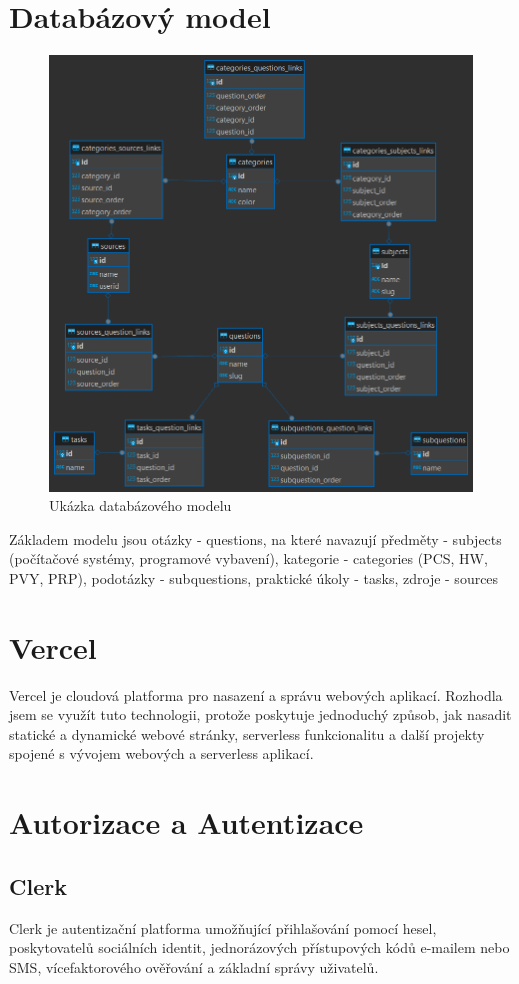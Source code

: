\documentclass[12pt, a4paper,
oneside,      %
openright
]{report}
\begin{document}
\newpage
\section{Databázový model}

\begin{figure}[h]
	\centering
	\includegraphics[width=0.7\linewidth]{image/scheme.png} 
	\caption{Ukázka databázového modelu}
\end{figure}

Základem modelu jsou otázky - questions, na které navazují předměty - subjects (počítačové systémy, programové vybavení), kategorie - categories (PCS, HW, PVY, PRP), podotázky - subquestions, praktické úkoly - tasks, zdroje - sources

\section{Vercel}
Vercel je cloudová platforma pro nasazení a správu webových aplikací. Rozhodla jsem se využít tuto technologii, protože poskytuje jednoduchý způsob, jak nasadit statické a dynamické webové stránky, serverless funkcionalitu a další projekty spojené s vývojem webových a serverless aplikací.

\section{Autorizace a Autentizace}

\newpage
\subsection{Clerk}
Clerk je autentizační platforma umožňující přihlašování pomocí hesel, poskytovatelů sociálních identit, jednorázových přístupových kódů e-mailem nebo SMS, vícefaktorového ověřování a základní správy uživatelů.
\end{document}
